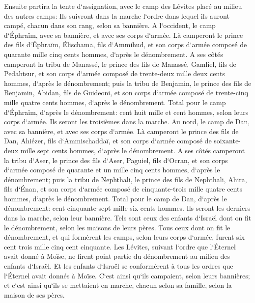 \verse Ensuite partira la tente d`assignation, avec le camp des Lévites placé au milieu des autres camps: Ils suivront dans la marche l`ordre dans lequel ils auront campé, chacun dans son rang, selon sa bannière. 
\verse A l`occident, le camp d`Éphraïm, avec sa bannière, et avec ses corps d`armée. Là camperont le prince des fils d`Éphraïm, Élischama, fils d`Ammihud, 
\verse et son corps d`armée composé de quarante mille cinq cents hommes, d`après le dénombrement. 
\verse A ses côtés camperont la tribu de Manassé, le prince des fils de Manassé, Gamliel, fils de Pedahtsur, 
\verse et son corps d`armée composé de trente-deux mille deux cents hommes, d`après le dénombrement; 
\verse puis la tribu de Benjamin, le prince des fils de Benjamin, Abidan, fils de Guideoni, 
\verse et son corps d`armée composé de trente-cinq mille quatre cents hommes, d`après le dénombrement. 
\verse Total pour le camp d`Éphraïm, d`après le dénombrement: cent huit mille et cent hommes, selon leurs corps d`armée. Ils seront les troisièmes dans la marche. 
\verse Au nord, le camp de Dan, avec sa bannière, et avec ses corps d`armée. Là camperont le prince des fils de Dan, Ahiézer, fils d`Ammischaddaï, 
\verse et son corps d`armée composé de soixante-deux mille sept cents hommes, d`après le dénombrement. 
\verse A ses côtés camperont la tribu d`Aser, le prince des fils d`Aser, Paguiel, fils d`Ocran, 
\verse et son corps d`armée composé de quarante et un mille cinq cents hommes, d`après le dénombrement; 
\verse puis la tribu de Nephthali, le prince des fils de Nephthali, Ahira, fils d`Énan, 
\verse et son corps d`armée composé de cinquante-trois mille quatre cents hommes, d`après le dénombrement. 
\verse Total pour le camp de Dan, d`après le dénombrement: cent cinquante-sept mille six cents hommes. Ils seront les derniers dans la marche, selon leur bannière. 
\verse Tels sont ceux des enfants d`Israël dont on fit le dénombrement, selon les maisons de leurs pères. Tous ceux dont on fit le dénombrement, et qui formèrent les camps, selon leurs corps d`armée, furent six cent trois mille cinq cent cinquante. 
\verse Les Lévites, suivant l`ordre que l`Éternel avait donné à Moïse, ne firent point partie du dénombrement au milieu des enfants d`Israël. 
\verse Et les enfants d`Israël se conformèrent à tous les ordres que l`Éternel avait donnés à Moïse. C`est ainsi qu`ils campaient, selon leurs bannières; et c`est ainsi qu`ils se mettaient en marche, chacun selon sa famille, selon la maison de ses pères. 


